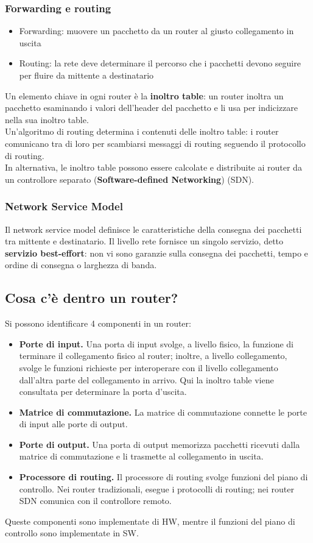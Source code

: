 \documentclass[11pt]{article}
\begin{document}
\subsubsection{Forwarding e routing}
\begin{itemize}
    \item Forwarding: muovere un pacchetto da un router al giusto collegamento in uscita
    \item Routing: la rete deve determinare il percorso che i pacchetti devono seguire per fluire da mittente a destinatario
\end{itemize}
Un elemento chiave in ogni router è la \textbf{inoltro table}: un router inoltra un pacchetto esaminando i valori dell'header 
del pacchetto e li usa per indicizzare nella sua inoltro table.\\
Un'algoritmo di routing determina i contenuti delle inoltro table: i router comunicano tra di loro per scambiarsi messaggi 
di routing seguendo il protocollo di routing.\\
In alternativa, le inoltro table possono essere calcolate e distribuite ai router da un controllore separato 
(\textbf{Software-defined Networking}) (SDN).
\subsubsection{Network Service Model}
Il network service model definisce le caratteristiche della consegna dei pacchetti tra mittente e destinatario. Il livello 
rete fornisce un singolo servizio, detto \textbf{servizio best-effort}: non vi sono garanzie sulla consegna dei pacchetti, 
tempo e ordine di consegna o larghezza di banda.
\subsection{Cosa c'è dentro un router?}
Si possono identificare 4 componenti in un router:
\begin{itemize}
    \item \textbf{Porte di input.} Una porta di input svolge, a livello fisico, la funzione di terminare il collegamento 
    fisico al router; inoltre, a livello collegamento, svolge le funzioni richieste per interoperare con il livello collegamento 
    dall'altra parte del collegamento in arrivo. Qui la inoltro table viene consultata per determinare la porta d'uscita.
    \item \textbf{Matrice di commutazione.} La matrice di commutazione connette le porte di input alle porte di output.
    \item \textbf{Porte di output.} Una porta di output memorizza pacchetti ricevuti dalla matrice di commutazione e li 
    trasmette al collegamento in uscita.
    \item \textbf{Processore di routing.} Il processore di routing svolge funzioni del piano di controllo. Nei router 
    tradizionali, esegue i protocolli di routing; nei router SDN comunica con il controllore remoto.
\end{itemize}
Queste componenti sono implementate di HW, mentre il funzioni del piano di controllo sono implementate in SW.
\end{document}
